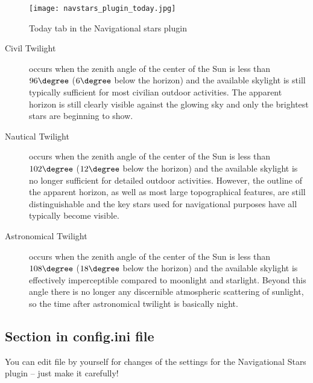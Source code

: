 \begin{figure}[htbp]
  \centering\texttt{[image: navstars\_plugin\_today.jpg]}
  \caption{Today tab in the Navigational stars plugin}
  \label{fig:plugin:NavigationalStars:Today}
\end{figure}

\begin{description}
\item[Civil Twilight] occurs when the zenith angle of the center of the Sun is less than $96\degree$ ($6\degree$ below the horizon)
  and the available skylight is still typically sufficient for most civilian outdoor activities. The apparent horizon is still
  clearly visible against the glowing sky and only the brightest stars are beginning to show.
\item[Nautical Twilight] occurs when the zenith angle of the center of the Sun is less than $102\degree$ ($12\degree$ below the horizon)
  and the available skylight is no longer sufficient for detailed outdoor activities. However, the outline of the apparent horizon,
  as well as most large topographical features, are still distinguishable and the key stars used for navigational purposes have all typically become visible.
\item[Astronomical Twilight] occurs when the zenith angle of the center of the Sun is less than $108\degree$ ($18\degree$ below the horizon)
  and the available skylight is effectively imperceptible compared to moonlight and starlight. Beyond this angle there is
  no longer any discernible atmospheric scattering of sunlight, so the time after astronomical twilight is basically night.
\end{description}

\subsection{Section  in config.ini file}

You can edit  file by yourself for changes of the
settings for the Navigational Stars plugin -- just make it carefully!

